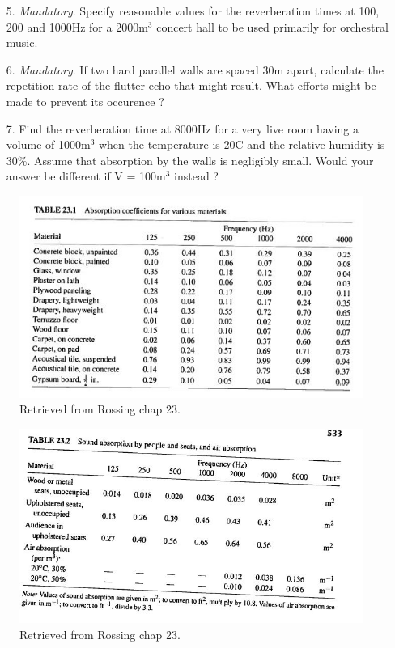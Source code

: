 \documentclass{article}
\begin{document}
\begin{itemize}
    \item[5.] \textit{Mandatory}. Specify reasonable values for the reverberation times at 100, 200 and 1000Hz for a 2000m$^3$ concert hall to be used primarily for orchestral music.
    
    \item[6.] \textit{Mandatory}. If two hard parallel walls are spaced 30m apart, calculate the repetition rate of the flutter echo that might result. What efforts might be made to prevent its occurence ?
    
    \item[7.] Find the reverberation time at 8000Hz for a very live room having a volume of 1000m$^3$ when the temperature is 20\degree C and the relative humidity is 30\%. Assume that absorption by the walls is negligibly small. Would your answer be different if V = 100m$^3$ instead ?
    
 
\end{itemize}


\begin{figure}[H]
    \centering
    \includegraphics[scale=0.9]{figures/table23_1.jpg}
   \caption{Retrieved from Rossing chap 23.}
    \label{fig:nc}
\end{figure}

\begin{figure}[H]
    \centering
    \includegraphics[scale=0.8]{figures/table23_2.jpg}
   \caption{Retrieved from Rossing chap 23.}
    \label{fig:nc}
\end{figure}
\end{document}
